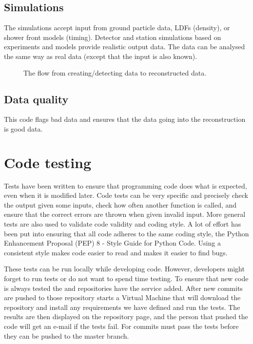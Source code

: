 \subsection{Simulations}

The simulations accept input from \corsika ground particle data, LDFs
(density), or shower front models (timing). Detector and station simulations based on experiments and models provide realistic output data. The data can be analysed the same way as real \hisparc data (except that the input is
also known).

\begin{figure}
    \centering
    
    \caption{ The flow from
             creating/detecting data to reconstructed data.}
    \label{fig:sapphire-flow}
\end{figure}


\subsection{Data quality}

This code flags bad data and ensures that the data going into the
reconstruction is good data. 



\section{Code testing}

Tests have been written to ensure that programming code does what is
expected, even when it is modified later. Code tests can be very
specific and precisely check the output given some inputs, check how
often another function is called, and ensure that the correct errors are
thrown when given invalid input. More general tests are also used to
validate code validity and coding style. A lot of effort has been put
into ensuring that all \python code adheres to the same coding style,
the Python Enhancement Proposal (PEP) 8 - Style Guide for Python Code. Using a consistent style makes code easier to read and makes it easier to find bugs.

These tests can be run locally while developing code. However,
developers might forget to run tests or do not want to spend time
testing. To ensure that new code is always tested the \sapphire and
\jsparc repositories have the \travis service \cite{travis} added. After
new commits are pushed to those repository \travis starts a Virtual
Machine that will download the repository and install any requirements we have defined and run the tests. The results are then displayed on the
repository page, and the person that pushed the code will get an e-mail
if the tests fail. For \sapphire commits must pass the tests before they can be pushed to the master branch.


